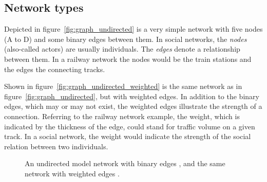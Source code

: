 \subsection{Network types}
\label{subsec:net_types}
Depicted in figure~\ref{fig:graph_undirected} is a very simple network with five nodes (A to D) and some binary edges between them. In social networks, the \textit{nodes} (also-called actors) are usually individuals. The \textit{edges} denote a relationship between them. In a railway network the nodes would be the train stations and the edges the connecting tracks.

Shown in figure~\ref{fig:graph_undirected_weighted} is the same network as in figure~\ref{fig:graph_undirected}, but with weighted edges. In addition to the binary edges, which may or may not exist, the weighted edges illustrate the strength of a connection. Referring to the railway network example, the weight, which is indicated by the thickness of the edge, could stand for traffic volume on a given track. In a social network, the weight would indicate the strength of the social relation between two individuals.  

\begin{figure}[htpb]%
	\centering 
	\qquad 
	\caption[Undirected model network with binary and weighted edges]{An undirected model network with binary edges , and the same network with weighted edges .} 

\end{figure}	 

